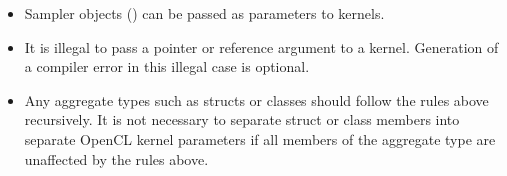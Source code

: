 \begin{itemize}
  \item
    Sampler objects () can be passed as
    parameters to kernels.

  \item
    It is illegal to pass a pointer or reference argument to a
    kernel. Generation of a compiler error in this illegal case is
    optional.  \item Any aggregate types such as structs or classes
    should follow the rules above recursively. It is not necessary to
    separate struct or class members into separate OpenCL kernel
    parameters if all members of the aggregate type are unaffected by
    the rules above.

\end{itemize}

